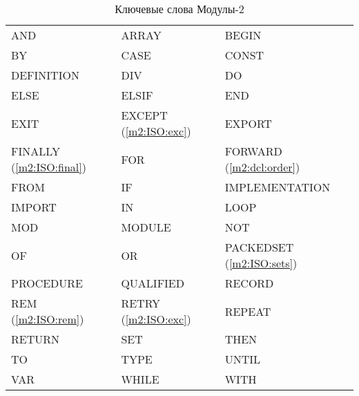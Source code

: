\begin{table}[bht]
\footnotesize
\begin{center}
\begin{tabular}{p{3.4cm}p{3.4cm}p{3.4cm}}
AND             & ARRAY                     &       BEGIN           \\
BY              & CASE                      &       CONST           \\
DEFINITION      & DIV                       &       DO              \\
ELSE            & ELSIF                     &       END             \\
EXIT            & EXCEPT (\ref{m2:ISO:exc}) &       EXPORT          \\
FINALLY (\ref{m2:ISO:final}) & FOR          &       FORWARD (\ref{m2:dcl:order})  \\
FROM            & IF                        &       IMPLEMENTATION  \\
IMPORT          & IN                        &       LOOP            \\
MOD             & MODULE                    &       NOT             \\
OF              & OR                        &       PACKEDSET (\ref{m2:ISO:sets}) \\
PROCEDURE       & QUALIFIED                 &       RECORD          \\
REM (\ref{m2:ISO:rem})  & RETRY (\ref{m2:ISO:exc}) &       REPEAT          \\
RETURN          & SET                       &       THEN            \\
TO              & TYPE                      &       UNTIL           \\
VAR             & WHILE                     &       WITH            \\
\end{tabular}
\end{center}
\caption{Ключевые слова Модулы-2}\label{table:m2:ISO:keywords}
\end{table}

